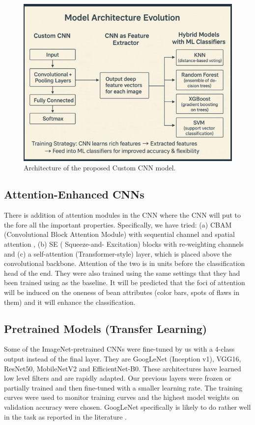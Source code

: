 \documentclass[conference]{IEEEtran}
\begin{document}
\begin{figure}[htbp]
    \centering
    \includegraphics[scale=0.2]{custom_cnn.png}
    \caption{Architecture of the proposed Custom CNN model.}
    \label{fig:custom_cnn}
\end{figure}

\subsection{Attention-Enhanced CNNs}
There is addition of attention modules in the CNN where the CNN will put to the fore all the important properties. Specifically, we have tried: (a) CBAM (Convolutional Block Attention Module) with sequential channel and spatial attention \cite{Woo2018}, (b) SE ( Squeeze-and- Excitation) blocks with re-weighting channels and (c) a self-attention (Transformer-style) layer, which is placed above the convolutional backbone. Attention of the two is in units before the classification head of the end. They were also trained using the same settings that they had been trained using as the baseline. It will be predicted that the foci of attention will be induced on the oneness of bean attributes (color bars, spots of flaws in them) and it will enhance the classification.

\subsection{Pretrained Models (Transfer Learning)}
Some of the ImageNet-pretrained CNNs were fine-tuned by us with a 4-class output instead of the final layer. They are GoogLeNet (Inception v1), VGG16, ResNet50, MobileNetV2 and EfficientNet-B0. These architectures have learned low level filters and are rapidly adapted. Our previous layers were frozen or partially trained and then fine-tuned with a smaller learning rate. The training curves were used to monitor training curves and the highest model weights on validation accuracy were chosen. GoogLeNet specifically is likely to do rather well in the task as reported in the literature \cite{Hassan2024}.
\end{document}
